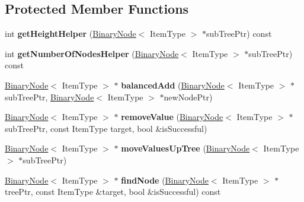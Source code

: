 \subsection*{Protected Member Functions}
\begin{DoxyCompactItemize}
\item 
\hypertarget{class_binary_node_tree_ab4fb3e839f07f821d7c1e038758cc111}{}\label{class_binary_node_tree_ab4fb3e839f07f821d7c1e038758cc111} 
int {\bfseries get\+Height\+Helper} (\hyperlink{class_binary_node}{Binary\+Node}$<$ Item\+Type $>$ $\ast$sub\+Tree\+Ptr) const
\item 
\hypertarget{class_binary_node_tree_a924b9aaeb31752e5fcfc2177726d2c58}{}\label{class_binary_node_tree_a924b9aaeb31752e5fcfc2177726d2c58} 
int {\bfseries get\+Number\+Of\+Nodes\+Helper} (\hyperlink{class_binary_node}{Binary\+Node}$<$ Item\+Type $>$ $\ast$sub\+Tree\+Ptr) const
\item 
\hypertarget{class_binary_node_tree_af4cd664f49b227fee63d354045a7e2af}{}\label{class_binary_node_tree_af4cd664f49b227fee63d354045a7e2af} 
\hyperlink{class_binary_node}{Binary\+Node}$<$ Item\+Type $>$ $\ast$ {\bfseries balanced\+Add} (\hyperlink{class_binary_node}{Binary\+Node}$<$ Item\+Type $>$ $\ast$sub\+Tree\+Ptr, \hyperlink{class_binary_node}{Binary\+Node}$<$ Item\+Type $>$ $\ast$new\+Node\+Ptr)
\item 
\hypertarget{class_binary_node_tree_a596c526de53c2fe3508ccbeea5f1bf67}{}\label{class_binary_node_tree_a596c526de53c2fe3508ccbeea5f1bf67} 
\hyperlink{class_binary_node}{Binary\+Node}$<$ Item\+Type $>$ $\ast$ {\bfseries remove\+Value} (\hyperlink{class_binary_node}{Binary\+Node}$<$ Item\+Type $>$ $\ast$sub\+Tree\+Ptr, const Item\+Type target, bool \&is\+Successful)
\item 
\hypertarget{class_binary_node_tree_ac273b8fe6bd5233f9aff4404a9ce0d9f}{}\label{class_binary_node_tree_ac273b8fe6bd5233f9aff4404a9ce0d9f} 
\hyperlink{class_binary_node}{Binary\+Node}$<$ Item\+Type $>$ $\ast$ {\bfseries move\+Values\+Up\+Tree} (\hyperlink{class_binary_node}{Binary\+Node}$<$ Item\+Type $>$ $\ast$sub\+Tree\+Ptr)
\item 
\hypertarget{class_binary_node_tree_ac11b93683d0572f0ba923037e4efc5e5}{}\label{class_binary_node_tree_ac11b93683d0572f0ba923037e4efc5e5} 
\hyperlink{class_binary_node}{Binary\+Node}$<$ Item\+Type $>$ $\ast$ {\bfseries find\+Node} (\hyperlink{class_binary_node}{Binary\+Node}$<$ Item\+Type $>$ $\ast$tree\+Ptr, const Item\+Type \&target, bool \&is\+Successful) const
\item 
\hypertarget{class_binary_node_tree_a7fe3c074cc9bc8c7cec0d9cf2033343f}{}\label{class_binary_node_tree_a7fe3c074cc9bc8c7cec0d9cf2033343f} 

\end{DoxyCompactItemize}
